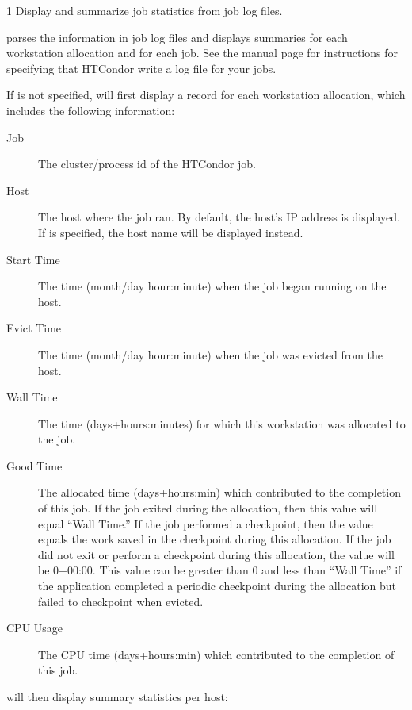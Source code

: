 \begin{ManPage}{\label{man-condor-userlog}}{1}
{Display and summarize job statistics from job log files.}
\Synopsis {}

\Description
{} parses the information in job log files and displays
summaries for each workstation allocation and for each job.  See the
 manual page for
instructions for specifying that HTCondor write a log file for your
jobs.

If  is not specified,  will first display
a record for each workstation allocation, which includes the following
information:

\begin{description}
\item[Job] The cluster/process id of the HTCondor job.
\item[Host] The host where the job ran.  By default, the host's IP
address is displayed.  If  is specified, the host name
will be displayed instead.
\item[Start Time] The time (month/day hour:minute) when the job began
running on the host.
\item[Evict Time] The time (month/day hour:minute) when
the job was evicted from the host.
\item[Wall Time] The time (days+hours:minutes) for which this workstation was
allocated to the job.
\item[Good Time] The allocated time (days+hours:min) which
contributed to the completion of this job.  If the job exited during
the allocation, then this value will equal ``Wall Time.''  If the job
performed a checkpoint, then the value equals the work saved in
the checkpoint during this allocation.  If the job did not exit or
perform a checkpoint during this allocation, the value will be 0+00:00.
This value can be greater than 0 and less than ``Wall Time'' if the
application completed a periodic checkpoint during the allocation but
failed to checkpoint when evicted.
\item[CPU Usage] The CPU time (days+hours:min) which contributed to
the completion of this job.
\end{description}

 will then display summary statistics per host:


\end{ManPage}
